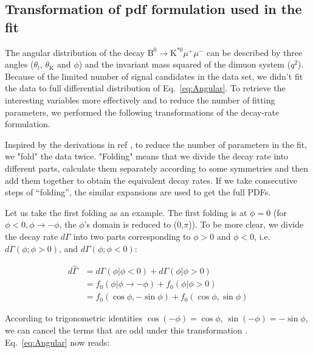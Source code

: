 \subsection{Transformation of pdf formulation used in the fit}
\label{sec:transform}

The angular distribution of the decay
$\text{B}^0 \rightarrow \text{K}^{*0} \mu^+ \mu^-$ can be described by
three angles ($\theta_l $, $\theta_\mathrm{K} $ and $\phi$) and the
invariant mass squared of the dimuon system ($q^2$). Because of the
limited number of signal candidates in the data set, we didn't fit the
data to full differential distribution of Eq.~\ref{eq:Angular}. To
retrieve the interesting variables more effectively and to reduce the
number of fitting parameters, we performed the following transformations of the
decay-rate formulation.


Inspired by the derivations in ref \cite{LHCb2}\cite{Matias2012}, to
reduce the number of parameters in the fit, we "fold" the data
twice. "Folding" means that we divide the decay rate into different
parts, calculate them separately according to some symmetries and then
add them together to obtain the equivalent decay rates. If we take
consecutive steps of ``folding'', the similar expansions are used to
get the full PDFs.

Let us take the first folding as an example.
The first folding is at
$ \phi=0$ (for $\phi<0,\phi\rightarrow-\phi$, the $\phi$'s domain is reduced to
    (0,$\pi$)). To be more clear, we divide the decay rate $d\Gamma$
into two parts corresponding to $\phi>0$ and $\phi<0$,
i.e. $d\Gamma(\phi;\phi>0)$, and $d\Gamma(\phi;\phi<0)$:

\begin{equation} \label{eq:folding}
    \begin{split}
        d\hat{\Gamma} &= d\Gamma(\phi|\phi<0) + d\Gamma(\phi|\phi>0) \\
        & = f_0(\phi|\phi\rightarrow-\phi) + f_0(\phi|\phi>0) \\
        & = f_0(\cos\phi, -\sin\phi) + f_0(\cos\phi, \sin\phi)
    \end{split}
\end{equation}


According to trigonometric identities $\cos(-\phi) = \cos\phi $,
$\sin(-\phi) = -\sin\phi $, we can cancel the terms 
that are odd under this transformation
. Eq.~\ref{eq:Angular} now reads:

